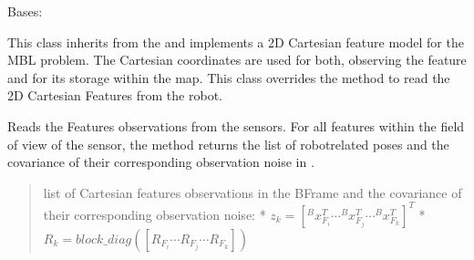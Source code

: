 \documentclass[letterpaper,10pt,english]{sphinxmanual}
\begin{document}
\begin{fulllineitems}
\label{\detokenize{FEKFMBLocalization:MapFeature.Cartesian2DMapFeature}}
\pysigstartsignatures
{}
\pysigstopsignatures
\sphinxAtStartPar
Bases: {\hyperref[\detokenize{FEKFMBLocalization:MapFeature.MapFeature}]{}}

\sphinxAtStartPar
This class inherits from the {\hyperref[\detokenize{FEKFMBLocalization:MapFeature.MapFeature}]{}} and implements a 2D Cartesian feature model for the MBL problem. The Cartesian coordinates are used for both,
observing the feature and for its storage within the map. This class overrides the {\hyperref[\detokenize{FEKFMBLocalization:MapFeature.Cartesian2DMapFeature.GetFeatures}]{}} method to read
the 2D Cartesian Features from the robot.

\begin{fulllineitems}
\label{\detokenize{FEKFMBLocalization:MapFeature.Cartesian2DMapFeature.GetFeatures}}
\pysigstartsignatures
{}
\pysigstopsignatures
\sphinxAtStartPar
Reads the Features observations from the sensors. For all features within the field of view of the sensor, the
method returns the list of robot\sphinxhyphen{}related poses and the covariance of their corresponding observation noise in .
\begin{quote}\begin{description}
\sphinxAtStartPar
list of Cartesian features observations in the B\sphinxhyphen{}Frame and the covariance of their corresponding observation noise:
* \(z_k=[^Bx_{F_i}^T \cdots ^Bx_{F_j}^T \cdots ^Bx_{F_k}^T]^T\)
* \(R_k=block\_diag([R_{F_i} \cdots R_{F_j} \cdots R_{F_k}])\)

\end{description}\end{quote}

\end{fulllineitems}


\end{fulllineitems}
\end{document}
